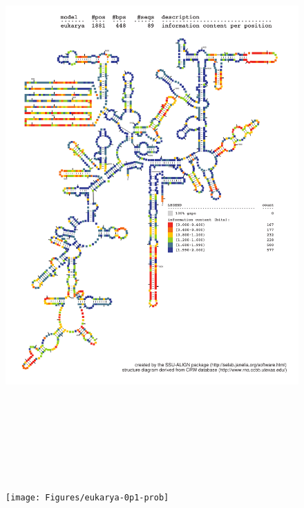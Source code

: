 \begin{figure}
\includegraphics[height=8.5in]{Figures/eukarya-0p1-info}
\label{fig:eukinfo}
\end{figure}

\newpage

\begin{figure}
\texttt{[image: Figures/eukarya-0p1-prob]}
\label{fig:eukinfo}
\end{figure}

\newpage

